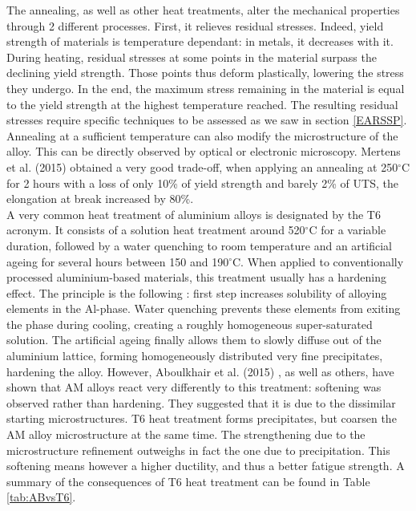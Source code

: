 The annealing, as well as other heat treatments, alter the mechanical properties through 2 different processes. First, it relieves residual stresses. Indeed, yield strength of materials is temperature dependant: in metals, it decreases with it. During heating, residual stresses at some points in the material surpass the declining yield strength. Those points thus deform plastically, lowering the stress they undergo. In the end, the maximum stress remaining in the material is equal to the yield strength at the highest temperature reached. The resulting residual stresses require specific techniques to be assessed as we saw in section \ref{EARSSP}.\\

Annealing at a sufficient temperature can also modify the microstructure of the alloy. This can be directly observed by optical or electronic microscopy. Mertens et al. (2015)\cite{Mertens15} obtained a very good trade-off, when applying an annealing at 250$^\circ$C for 2 hours with a loss of only 10\% of yield strength and barely 2\% of UTS, the elongation at break increased by 80\%. \\

A very common heat treatment of aluminium alloys is designated by the T6 acronym. It consists of a solution heat treatment around 520$^\circ$C for a variable duration, followed by a water quenching to room temperature and an artificial ageing for several hours between 150 and 190$^\circ$C. When applied to conventionally processed aluminium-based materials, this treatment usually has a hardening effect. The principle is the following \cite{T6}: first step increases solubility of alloying elements in the Al-phase. Water quenching prevents these elements from exiting the phase during cooling, creating a roughly homogeneous super-saturated solution. The artificial ageing finally allows them to slowly diffuse out of the aluminium lattice, forming homogeneously distributed very fine precipitates, hardening the alloy. However, Aboulkhair et al. (2015) \cite{aboulkhair2015}, as well as others, have shown that AM alloys react very differently to this treatment: softening was observed rather than hardening. They suggested that it is due to the dissimilar starting microstructures. T6 heat treatment forms precipitates, but coarsen the AM alloy microstructure at the same time. The strengthening due to the microstructure refinement outweighs in fact the one due to precipitation. This softening means however a higher ductility, and thus a better fatigue strength. A summary of the consequences of T6 heat treatment can be found in Table \ref{tab:ABvsT6}. \\

